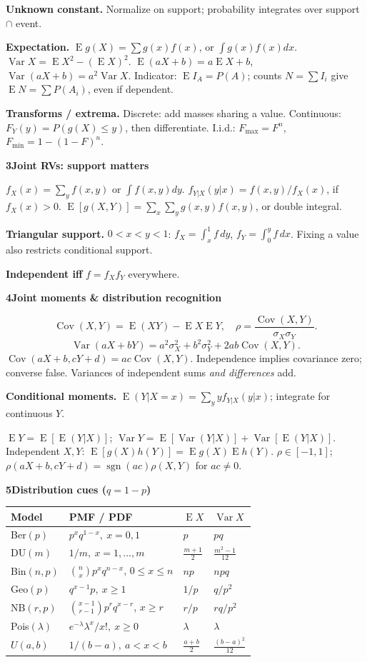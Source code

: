 \documentclass[a4paper,landscape]{article}
\newcommand{\head}[2][late]{\par\vspace{3pt}\noindent\colorbox{#1}{\parbox{\dimexpr\linewidth-6pt}{\color{white}\bfseries #2}}\par\vspace{1pt}}
\newcommand{\cue}[1]{\par\textbf{#1}\enspace}
\newcommand{\E}{\operatorname{E}}
\newcommand{\V}{\operatorname{Var}}
\newcommand{\Cov}{\operatorname{Cov}}
\newcommand{\col}{\par\vfill\columnbreak}
\newcommand{\tblhead}[1]{\textbf{#1}}
\begin{document}
\begin{multicols*}{4}
\cue{Unknown constant.} Normalize on support; probability integrates over support \(\cap\) event.
\cue{Expectation.} \(\E g(X)=\sum g(x)f(x)\), or \(\int g(x)f(x)dx\). \(\V X=\E X^2-(\E X)^2\).
\(\E(aX+b)=a\E X+b\), \(\V(aX+b)=a^2\V X\).
Indicator: \(\E I_A=P(A)\); counts \(N=\sum I_i\) give \(\E N=\sum P(A_i)\), even if dependent.
\cue{Transforms / extrema.} Discrete: add masses sharing a value. Continuous: \(F_Y(y)=P(g(X)\le y)\), then differentiate. I.i.d.: \(F_{\max}=F^n\), \(F_{\min}=1-(1-F)^n\).
\head[early]{3\quad Joint RVs: support matters}
\(f_X(x)=\sum_y f(x,y)\) or \(\int f(x,y)dy\).
\(f_{Y|X}(y|x)=f(x,y)/f_X(x)\), if \(f_X(x)>0\).
\(\E[g(X,Y)]=\sum_x\sum_y g(x,y)f(x,y)\), or double integral.
\cue{Triangular support.} \(0<x<y<1\): \(f_X=\int_x^1f\,dy\), \(f_Y=\int_0^yf\,dx\). Fixing a value also restricts conditional support.
\cue{Independent iff} \(f=f_Xf_Y\) everywhere.
\col
\setlength{\parskip}{.5pt}
\head[early]{4\quad Joint moments \& distribution recognition}
\[\Cov(X,Y)=\E(XY)-\E X\E Y,\quad
 \rho=\frac{\Cov(X,Y)}{\sigma_X\sigma_Y}.\]
\[\V(aX+bY)=a^2\sigma_X^2+b^2\sigma_Y^2+2ab\Cov(X,Y).\]
\(\Cov(aX+b,cY+d)=ac\Cov(X,Y)\). Independence implies covariance zero; converse false. Variances of independent sums \emph{and differences} add.
\cue{Conditional moments.} \(\E(Y|X=x)=\sum_y y f_{Y|X}(y|x)\); integrate for continuous \(Y\).\par
\(\E Y=\E[\E(Y|X)]\); \(\V Y=\E[\V(Y|X)]+\V[\E(Y|X)]\).
Independent \(X,Y\): \(\E[g(X)h(Y)]=\E g(X)\E h(Y)\). \(\rho\in[-1,1]\); \(\rho(aX+b,cY+d)=\operatorname{sgn}(ac)\rho(X,Y)\) for \(ac\ne0\).
\head[early]{5\quad Distribution cues \quad (\(q=1-p\))}
\begin{tabular}{@{}L{.22\linewidth}L{.39\linewidth}L{.13\linewidth}L{.16\linewidth}@{}}
\tblhead{Model} & \tblhead{PMF / PDF} & \(\E X\) & \(\V X\)\\\hline
Ber\((p)\) & \(p^xq^{1-x},\ x=0,1\) & \(p\) & \(pq\)\\
DU\((m)\) & \(1/m,\ x=1,\ldots,m\) & \(\frac{m+1}{2}\) & \(\frac{m^2-1}{12}\)\\
Bin\((n,p)\) & \({n\choose x}p^xq^{n-x}\), \(0\le x\le n\) & \(np\) & \(npq\)\\
Geo\((p)\) & \(q^{x-1}p,\ x\ge1\) & \(1/p\) & \(q/p^2\)\\
NB\((r,p)\) & \({x-1\choose r-1}p^rq^{x-r}\), \(x\ge r\) & \(r/p\) & \(rq/p^2\)\\
Pois\((\lambda)\) & \(e^{-\lambda}\lambda^x/x!,\ x\ge0\) & \(\lambda\) & \(\lambda\)\\
\(U(a,b)\) & \(1/(b-a),\ a<x<b\) & \(\frac{a+b}{2}\) & \(\frac{(b-a)^2}{12}\)\\

\end{tabular}
\end{multicols*}
\end{document}
